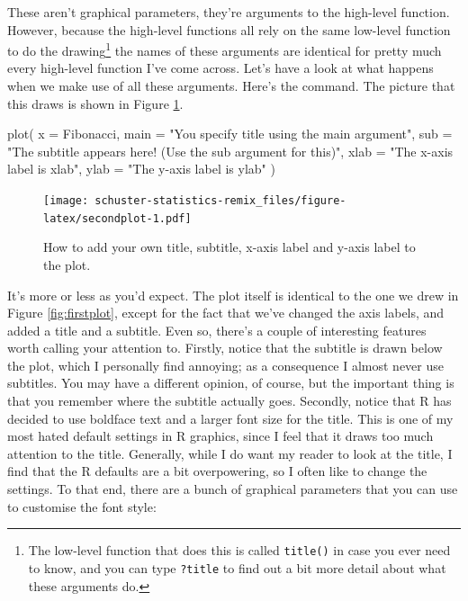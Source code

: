 \documentclass[
]{book}
\newenvironment{Shaded}{\begin{snugshade}}{\end{snugshade}}
\newcommand{\AttributeTok}[1]{\textcolor[rgb]{0.77,0.63,0.00}{#1}}
\newcommand{\FunctionTok}[1]{\textcolor[rgb]{0.00,0.00,0.00}{#1}}
\newcommand{\NormalTok}[1]{#1}
\newcommand{\StringTok}[1]{\textcolor[rgb]{0.31,0.60,0.02}{#1}}
\begin{document}
These aren't graphical parameters, they're arguments to the high-level function. However, because the high-level functions all rely on the same low-level function to do the drawing\footnote{The low-level function that does this is called \texttt{title()} in case you ever need to know, and you can type \texttt{?title} to find out a bit more detail about what these arguments do.} the names of these arguments are identical for pretty much every high-level function I've come across. Let's have a look at what happens when we make use of all these arguments. Here's the command. The picture that this draws is shown in Figure \ref{fig:secondplot}.

\begin{Shaded}
\begin{Highlighting}[]
\FunctionTok{plot}\NormalTok{( }\AttributeTok{x =}\NormalTok{ Fibonacci,}
               \AttributeTok{main =} \StringTok{"You specify title using the \textquotesingle{}main\textquotesingle{} argument"}\NormalTok{,}
               \AttributeTok{sub =} \StringTok{"The subtitle appears here! (Use the \textquotesingle{}sub\textquotesingle{} argument for this)"}\NormalTok{,}
               \AttributeTok{xlab =} \StringTok{"The x{-}axis label is \textquotesingle{}xlab\textquotesingle{}"}\NormalTok{,}
                \AttributeTok{ylab =} \StringTok{"The y{-}axis label is \textquotesingle{}ylab\textquotesingle{}"} 
\NormalTok{            )}
\end{Highlighting}
\end{Shaded}

\begin{figure}
\centering
\texttt{[image: schuster-statistics-remix\_files/figure-latex/secondplot-1.pdf]}
\caption{\label{fig:secondplot}How to add your own title, subtitle, x-axis label and y-axis label to the plot.}
\end{figure}

It's more or less as you'd expect. The plot itself is identical to the one we drew in Figure \ref{fig:firstplot}, except for the fact that we've changed the axis labels, and added a title and a subtitle. Even so, there's a couple of interesting features worth calling your attention to. Firstly, notice that the subtitle is drawn below the plot, which I personally find annoying; as a consequence I almost never use subtitles. You may have a different opinion, of course, but the important thing is that you remember where the subtitle actually goes. Secondly, notice that R has decided to use boldface text and a larger font size for the title. This is one of my most hated default settings in R graphics, since I feel that it draws too much attention to the title. Generally, while I do want my reader to look at the title, I find that the R defaults are a bit overpowering, so I often like to change the settings. To that end, there are a bunch of graphical parameters that you can use to customise the font style:
\end{document}

